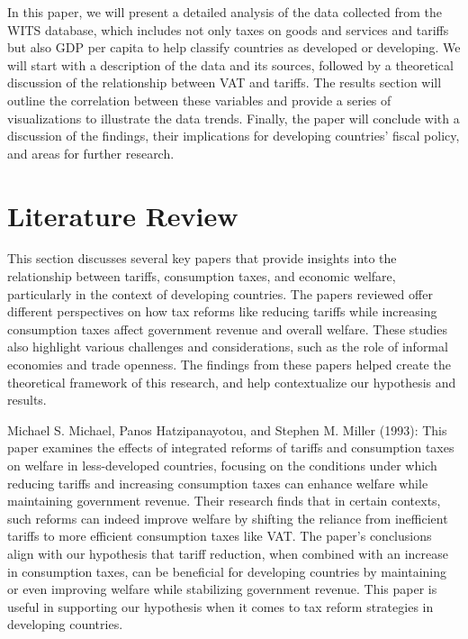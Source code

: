 \documentclass[12pt]{article}
\begin{document}
In this paper, we will present a detailed analysis of the data collected from the WITS database, which includes not only taxes on goods and services and tariffs but also GDP per capita to help classify countries as developed or developing. We will start with a description of the data and its sources, followed by a theoretical discussion of the relationship between VAT and tariffs. The results section will outline the correlation between these variables and provide a series of visualizations to illustrate the data trends. Finally, the paper will conclude with a discussion of the findings, their implications for developing countries' fiscal policy, and areas for further research.

\section{Literature Review} \label{sec:literature}

This section discusses several key papers that provide insights into the relationship between tariffs, consumption taxes, and economic welfare, particularly in the context of developing countries. The papers reviewed offer different perspectives on how tax reforms like reducing tariffs while increasing consumption taxes affect government revenue and overall welfare. These studies also highlight various challenges and considerations, such as the role of informal economies and trade openness. The findings from these papers helped create the theoretical framework of this research, and help contextualize our hypothesis and results.

Michael S. Michael, Panos Hatzipanayotou, and Stephen M. Miller (1993):
This paper examines the effects of integrated reforms of tariffs and consumption taxes on welfare in less-developed countries, focusing on the conditions under which reducing tariffs and increasing consumption taxes can enhance welfare while maintaining government revenue. Their research finds that in certain contexts, such reforms can indeed improve welfare by shifting the reliance from inefficient tariffs to more efficient consumption taxes like VAT. The paper’s conclusions align with our hypothesis that tariff reduction, when combined with an increase in consumption taxes, can be beneficial for developing countries by maintaining or even improving welfare while stabilizing government revenue. This paper is useful in supporting our hypothesis when it comes to tax reform strategies in developing countries.
\end{document}
